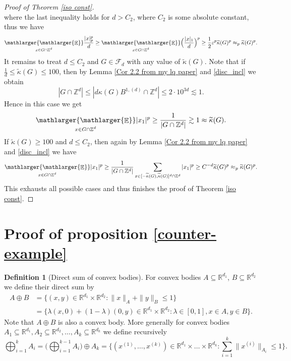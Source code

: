 \documentclass[a4paper,oneside, reqno]{amsart}
\numberwithin{equation}{section}
\theoremstyle{definition}%
\theoremstyle{definition}
\newtheorem{Defn}[Thm]{Definition}
\theoremstyle{definition}%
\theoremstyle{definition}
\newcommand{\E}{\mathop{\mathbb{E}}}
\newcommand{\Z}{\mathbb{Z}}
\newcommand{\R}{\mathbb{R}}
\newcommand{\se}[1]{\underset{_{\substack{#1}}}{\mathlarger{\mathlarger{\E}}}}
\begin{document}
\begin{proof}[Proof of Theorem \ref{iso const}]
\[    \]
    where the last inequality holds for $d>C_2$, where $C_2$ is some absolute constant, thus we have
    \[
    \se{x \in G \cap \Z^d} \frac{|x|_p^p}{d} \ge \se{x \in G \cap \Z^d}  \Big( \frac{|x|_1}{d} \Big)^p \ge \frac{1}{2} \varepsilon^p \widetilde{\kappa}(G)^p \approx_p \widetilde{\kappa}(G)^p .
    \]
    It remains to treat $d \le C_2$ and $G \in \mathcal{F}_d$ with any value of $\widetilde{\kappa}(G)$. Note that if $\frac{1}{d} \le \widetilde{\kappa}(G) \le 100$, then by Lemma \ref{Cor 2.2 from my lq paper} and \eqref{disc_incl} we obtain
    \[
    |G \cap \Z^d| \le |d \kappa(G) B^{1,(d)} \cap \Z^d| \le 2 \cdot 10^{3d} \lesssim 1.
    \]
    Hence in this case we get 
    \[
    \se{x \in G \cap \Z^d} |x_1|^p \ge \frac{1}{|G \cap \Z^d|} \gtrsim 1 \approx  \widetilde{\kappa}(G). 
    \]
    If $\widetilde{\kappa}(G) \ge 100$ and $d \le C_2$, then again by Lemma \ref{Cor 2.2 from my lq paper} and \eqref{disc_incl} we have 
    \[
    \se{x \in G \cap \Z^d} |x_1|^p \ge \frac{1}{|G \cap \Z^d|} \sum_{x \in [-\widetilde{\kappa}(G),\widetilde{\kappa}(G)]^d \cap \Z^d} |x_1|^p \ge C^{-d} \widetilde{\kappa}(G)^p \approx_p \widetilde{\kappa}(G)^p.
    \]
    This exhausts all possible cases and thus finishes the proof of Theorem \ref{iso const}.
\end{proof}

\section{Proof of proposition \ref{counter-example}}
\begin{Defn}[Direct sum of convex bodies]
    For convex bodies $A \subseteq \R^{d_1}$, $B \subseteq \R^{d_2}$ we define their direct sum by
    \begin{align*}
        A \oplus B&= \Big\{(x,y) \in \R^{d_1} \times \R^{d_2}: \|x \|_{A}+ \|y \|_{B} \le 1 \Big\} \\
        &= \Big\{ \lambda (x,0)+ (1-\lambda)(0,y) \in  \R^{d_1} \times \R^{d_2}: \lambda \in [0,1], x \in A, y \in B \Big\}.
    \end{align*}
    Note that $A \oplus B$ is also a convex body.
    More generally for convex bodies $A_1 \subseteq \R^{d_1},A_2 \subseteq \R^{d_2}, \ldots,A_k \subseteq \R^{d_k}$ we define recursively
    \[
    \bigoplus_{i=1}^k A_i= \bigg(\bigoplus_{i=1}^{k-1} A_i \bigg) \oplus A_k= \Big\{(x^{(1)}, \ldots, x^{(k)}) \in \R^{d_1} \times \ldots \times \R^{d_k}: \sum_{i=1}^k \|x^{(i)}\|_{A_i} \le 1 \Big\}.
    \]
\end{Defn}
\end{document}

